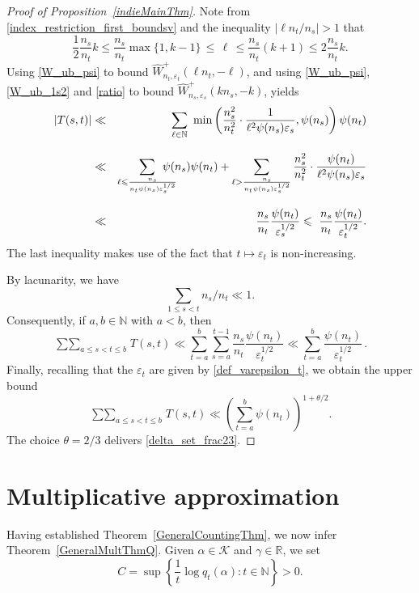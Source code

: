 \documentclass[12pt, reqno]{amsart}
\theoremstyle{definition}
\theoremstyle{remark}
\numberwithin{equation}{section}
\newcommand{\N}{\mathbb{N}}
\newcommand{\what}[1]{\widehat{#1}}
\def\eps{\varepsilon}
\def\leq{\leqslant}
\def \bN {\mathbb N}
\begin{document}
\begin{proof} [Proof of Proposition~\ref{indieMainThm}]
Note from \eqref{index_restriction_first_boundsv} and the inequality $\left|\ell n_t/n_s\right| > 1$ that
\begin{equation}
\label{ratio}
\frac12 \frac{n_s}{n_t}  k  \leq  \frac{n_s}{n_t} \max \{1,  k-1 \}  \, \leq \, \ell\, \leq \frac{n_s}{n_t} (k+1)\leq 2\frac{n_s}{n_t} k.
\end{equation}
Using \eqref{W_ub_psi} to bound $\what{W}_{n_t,\eps_t}^{+}(\ell n_t,-\ell)$, and using \eqref{W_ub_psi}, \eqref{W_ub_1s2} and \eqref{ratio}
to bound  
$\what{W}_{n_s,\eps_s}^{+}(k n_s,-k) $, yields
\begin{eqnarray*}
|T(s,t)| &\ll  & \sum_{\ell  \in \N }
\ \min\left(\frac{n_s^2}{n_t^2}\cdot\frac{1}{\ell^2\psi(n_s)\varepsilon_s},\psi(n_s)\right)\psi(n_t)\\[2ex]
&\ll&
\sum_{\ell \leq \frac{n_s}{n_t\psi(n_s)\varepsilon_s^{1/2}}} \hspace{-5mm}
\psi(n_s)\psi(n_t) +
\sum_{\ell > \frac{n_s}{n_t\psi(n_s)\varepsilon_s^{1/2}}} \frac{n_s^2}{n_t^2}\cdot
\frac{\psi(n_t)}{\ell^2\psi(n_s)
	\varepsilon_s}\\[2ex]
&\ll&
\frac{n_s}{n_t}\frac{\psi(n_t)}{\varepsilon_s^{1/2}}  \leq \ \frac{n_s}{n_t}\frac{\psi(n_t)}{\varepsilon_t^{1/2}}. 
\end{eqnarray*}
The last inequality makes use of the fact that 
$t \mapsto \eps_t$ is non-increasing.

By lacunarity, we have 
\[
\sum\limits_{1\leq s<t}n_s/n_t \ll 1.
\]
Consequently, if 
$a,b \in \N$ with 
$a <  b$, then
\[
\mathop{\sum\sum}_{a\leq s < t\leq b} T(s,t)
\ll \sum_{t=a}^b\sum_{s=a}^{t-1}\frac{n_s}{n_t}\frac{\psi(n_t)}{\varepsilon_t^{1/2}} 
\ll \sum_{t=a}^{b}\frac{\psi(n_t)}{\varepsilon_t^{1/2}}\, .
\]
Finally, recalling that the $\varepsilon_t$ are given by
\eqref{def_varepsilon_t}, we obtain the upper bound
\[
\mathop{\sum\sum}_{a\leq s < t\leq b} T(s,t)  \ll
\left(\sum_{t=a}^{b}\psi(n_t)\right)^{1+\theta/2}.
\]
The choice $\theta=2/3$ delivers \eqref{delta_set_frac23}.
\end{proof}

\section{Multiplicative approximation}
\label{MultSection}

Having established Theorem~\ref{GeneralCountingThm}, we now infer Theorem~\ref{GeneralMultThmQ}. %
Given $\alpha \in \mathcal{K}$ and $\gamma\in\mathbb{R}$, we set 
\[ 
C = \sup \left\{ \frac{1}{t} \log q_t(\alpha): t \in \bN \right\} 
> 0.  
\]
\end{document}
